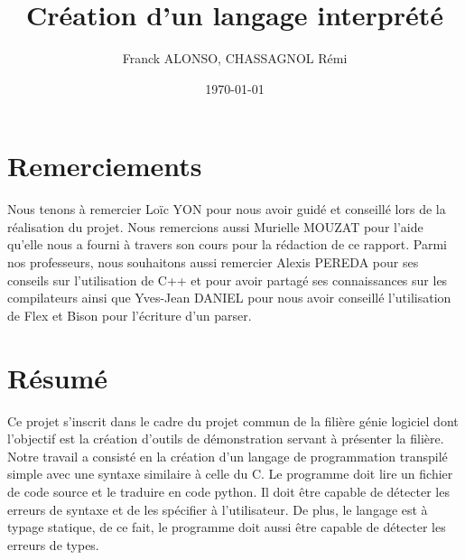\documentclass[a4paper]{article}%
\title{Création d'un langage interprété}
\author{Franck ALONSO, CHASSAGNOL Rémi}
\date{\today}
\begin{document}

\clearpage{}

\thispagestyle{empty}
\tableofcontents
\clearpage{}

\section*{Remerciements}
\thispagestyle{empty}

\doublespacing
\large

Nous tenons à remercier Loïc YON pour nous avoir guidé et conseillé lors de la
réalisation du projet. Nous remercions aussi Murielle MOUZAT pour l'aide qu'elle
nous a fourni à travers son cours pour la rédaction de ce rapport. Parmi nos
professeurs, nous souhaitons aussi remercier Alexis PEREDA pour ses conseils sur
l'utilisation de C++ et pour avoir partagé ses connaissances sur les
compilateurs ainsi que Yves-Jean DANIEL pour nous avoir conseillé l'utilisation
de Flex et Bison pour l'écriture d'un \gls{parser}.

\normalsize
\onehalfspacing

\clearpage{}

\listoffigures
\clearpage{}


\section*{Résumé}

Ce projet s'inscrit dans le cadre du projet commun de la filière génie logiciel
dont l'objectif est la création d'outils de démonstration servant à présenter la
filière. Notre travail a consisté en la création d'un langage de programmation
transpilé simple avec une syntaxe similaire à celle du C. Le programme doit lire
un fichier de code source et le traduire en code python. Il doit être capable
de détecter les erreurs de syntaxe et de les spécifier à l'utilisateur. De
plus, le langage est à typage statique, de ce fait, le programme doit aussi être
capable de détecter les erreurs de types.\\
\end{document}
